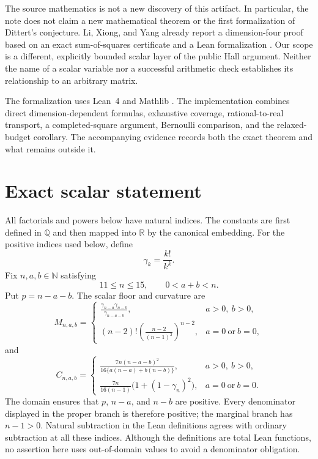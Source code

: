 \documentclass[11pt]{article}
\newcommand{\Q}{\mathbb{Q}}
\newcommand{\R}{\mathbb{R}}
\newcommand{\N}{\mathbb{N}}
\begin{document}
The source mathematics is not a new discovery of this artifact.
In particular, the note does not claim a new mathematical theorem or
the first formalization of Dittert's conjecture. Li, Xiong, and Yang
already report a dimension-four proof based on an exact sum-of-squares
certificate and a Lean formalization \cite{li2026proof}. Our scope is a
different, explicitly bounded scalar layer of the public Hall argument.
Neither the name of a scalar variable nor a successful arithmetic
check establishes its relationship to an arbitrary matrix.

The formalization uses Lean~4 \cite{moura2021lean} and Mathlib
\cite{community2020lean}. The implementation combines direct
dimension-dependent formulas, exhaustive coverage, rational-to-real
transport, a completed-square argument, Bernoulli comparison, and the
relaxed-budget corollary. The accompanying evidence records
both the exact theorem and what remains outside it.

\section{Exact scalar statement}

All factorials and powers below have natural indices. The constants are
first defined in $\Q$ and then mapped into $\R$ by the canonical embedding.
For the positive indices used below, define
\begin{equation}\label{eq:gamma}
 \gamma_k=\frac{k!}{k^k}.
\end{equation}
Fix $n,a,b\in\N$ satisfying
\begin{equation}\label{eq:domain}
 11\leq n\leq 15,\qquad 0<a+b<n.
\end{equation}
Put $p=n-a-b$. The scalar floor and curvature are
\begin{equation}\label{eq:floor}
 M_{n,a,b}=
 \begin{cases}
 \displaystyle\frac{\gamma_{n-a}\gamma_{n-b}}{\gamma_{n-a-b}},
       & a>0,\ b>0,\\[6pt]
 \displaystyle(n-2)!\left(\frac{n-2}{(n-1)^2}\right)^{n-2},
       & a=0\ \text{or}\ b=0,
 \end{cases}
\end{equation}
and
\begin{equation}\label{eq:curvature}
 C_{n,a,b}=
 \begin{cases}
 \displaystyle\frac{7n(n-a-b)^2}
 {16\{a(n-a)+b(n-b)\}},& a>0,\ b>0,\\[6pt]
 \displaystyle\frac{7n}{16(n-1)}
       \bigl(1+(1-\gamma_n)^2\bigr),& a=0\ \text{or}\ b=0.
 \end{cases}
\end{equation}
The domain ensures that $p$, $n-a$, and $n-b$ are positive. Every
denominator displayed in the proper branch is therefore positive;
the marginal branch has $n-1>0$. Natural subtraction in the Lean
definitions agrees with ordinary subtraction at all these indices.
Although the definitions are total Lean functions, no assertion here
uses out-of-domain values to avoid a denominator obligation.
\end{document}
